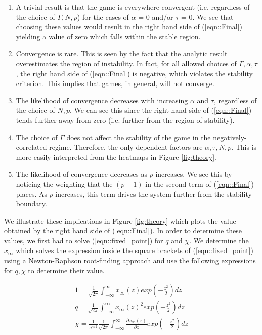 \documentclass[sigconf,anonymous]{aamas}
\newcommand{\xfixed}{x_\infty}
\begin{document}
\begin{enumerate}
    \item A trivial result is that the game is everywhere convergent (i.e. regardless of the choice of $\Gamma, N, p$) for the cases of $\alpha$ = 0 and/or $\tau$ = 0.  We see that choosing these values would result in the right hand side of (\ref{eqn::Final}) yielding a value of zero which falls within the stable region.
    \item Convergence is rare. This is seen by the fact that the analytic result overestimates the region of instability. In fact, for all allowed choices of $\Gamma, \alpha, \tau$, the right hand side of (\ref{eqn::Final}) is negative, which violates the stability criterion. This implies that games, in general, will not converge.
    \item The likelihood of convergence decreases with increasing $\alpha$ and $\tau$, regardless of the choice of $N, p$. We can see this since the right hand side of (\ref{eqn::Final}) tends further away from zero (i.e. further from the region of stability).
    \item The choice of $\Gamma$ does not affect the stability of the game in the negatively-correlated regime. Therefore, the only dependent factors are $\alpha, \tau, N, p$. This is more easily interpreted from the heatmaps in Figure \ref{fig:theory}.
    \item The likelihood of convergence decreases as $p$ increases. We see this by noticing the weighting that the $(p-1)$ in the second term of (\ref{eqn::Final}) places. As $p$ increases, this term drives the system further from the stability boundary.

\end{enumerate}

We illustrate these implications in Figure \ref{fig:theory} which plots the value obtained by the right hand side of (\ref{eqn::Final}). In order to determine these values, we first had to solve (\ref{eqn::fixed_point}) for $q$ and $\chi$. We determine the $\xfixed$ which solves the expression inside the square brackets of (\ref{eqn::fixed_point}) using a Newton-Raphson root-finding approach and use the following expressions for $q, \chi$ to determine their value. 

\begin{equation*}
    \begin{split}
        1 = \frac{1}{\sqrt{2 \pi}} \int_{-\infty}^{\infty} \xfixed(z) exp(-\frac{z^2}{2}) dz \\ 
        q = \frac{1}{\sqrt{2 \pi}} \int_{-\infty}^{\infty} \xfixed(z)^2 exp(-\frac{z^2}{2}) dz \\ 
        \chi = \frac{1}{q^{n/2}}\frac{1}{\sqrt{2 \pi}} \int_{-\infty}^{\infty} \frac{\partial \xfixed (z)}{\partial z} exp(-\frac{z^2}{2}) dz
    \end{split}
\end{equation*}
\end{document}
